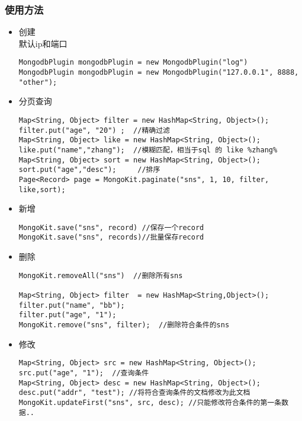 \documentclass{scrartcl}
\begin{document}
\subsubsection{使用方法}
\label{sec-2-6-2}
\begin{itemize}

\item 创建\\
\label{sec-2-6-2-1}%
默认ip和端口

\begin{verbatim}
MongodbPlugin mongodbPlugin = new MongodbPlugin("log")
MongodbPlugin mongodbPlugin = new MongodbPlugin("127.0.0.1", 8888, "other");
\end{verbatim}



\item 分页查询\\
\label{sec-2-6-2-2}%
\begin{verbatim}
Map<String, Object> filter = new HashMap<String, Object>();
filter.put("age", "20") ;  //精确过滤
Map<String, Object> like = new HashMap<String, Object>();
like.put("name","zhang");  //模糊匹配，相当于sql 的 like %zhang%
Map<String, Object> sort = new HashMap<String, Object>();
sort.put("age","desc");     //排序
Page<Record> page = MongoKit.paginate("sns", 1, 10, filter, like,sort);
\end{verbatim}

\item 新增\\
\label{sec-2-6-2-3}%
\begin{verbatim}
MongoKit.save("sns", record) //保存一个record
MongoKit.save("sns", records)//批量保存record
\end{verbatim}


\item 删除\\
\label{sec-2-6-2-4}%
\begin{verbatim}
MongoKit.removeAll("sns")  //删除所有sns

Map<String, Object> filter  = new HashMap<String,Object>();
filter.put("name", "bb");
filter.put("age", "1");
MongoKit.remove("sns", filter);  //删除符合条件的sns
\end{verbatim}

\item 修改\\
\label{sec-2-6-2-5}%
\begin{verbatim}
Map<String, Object> src = new HashMap<String, Object>();
src.put("age", "1");  //查询条件
Map<String, Object> desc = new HashMap<String, Object>();
desc.put("addr", "test"); //将符合查询条件的文档修改为此文档
MongoKit.updateFirst("sns", src, desc); //只能修改符合条件的第一条数据..
\end{verbatim}
\end{itemize} %
\end{document}
